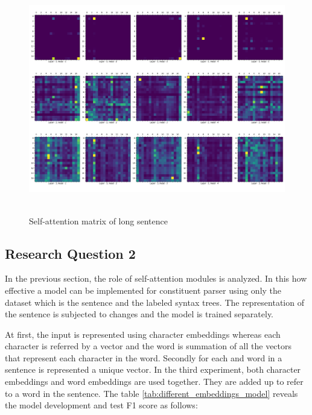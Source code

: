 \documentclass[a4paper, 11pt]{article}
\begin{document}
\begin{figure}[H]
    \centering
    \includegraphics[width=\textwidth,height=10cm,keepaspectratio=true]
    {self-attention-matrix-2.png}
    \caption{
        Self-attention matrix of long sentence
    }
    \label{fig:self-attention-matrix-large-sentence}
\end{figure}


\subsection{Research Question 2}

In the previous section, the role of self-attention modules is analyzed. In this how effective a model can be implemented for constituent parser using only the dataset which is the sentence and the labeled syntax trees. The representation of the sentence is subjected to changes and the model is trained separately. 

At first, the input is represented using character embeddings whereas each character is referred by a vector and the word is summation of all the vectors that represent each character in the word. Secondly for each and word in a sentence is represented a unique vector. In the third experiment, both character embeddings and word embeddings are used together. They are added up to refer to a word in the sentence. The table \ref{tab:different_embeddings_model} reveals the model development and test F1 score as follows:
\end{document}
